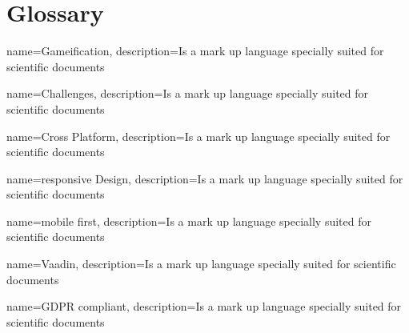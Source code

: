 \chapter{Glossary}

{
    name=Gameification,
    description={Is a mark up language specially suited
    for scientific documents}
}


{
    name=Challenges,
    description={Is a mark up language specially suited
    for scientific documents}
}


{
    name=Cross Platform,
    description={Is a mark up language specially suited
    for scientific documents}
}


{
    name=responsive Design,
    description={Is a mark up language specially suited
    for scientific documents}
}


{
    name=mobile first,
    description={Is a mark up language specially suited
    for scientific documents}
}


{
    name=Vaadin,
    description={Is a mark up language specially suited
    for scientific documents}
}


{
    name=GDPR compliant,
    description={Is a mark up language specially suited
    for scientific documents}
}


\printglossaries
